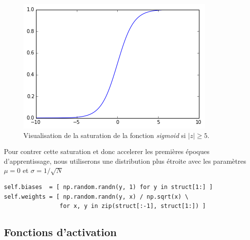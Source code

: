 \documentclass[11pt]{article}
\begin{document}
\begin{figure}[htp]
	\centering
	\includegraphics[scale=.5]{img/sigmoid_sat.png}
	\caption{Visualisation de la saturation de la fonction \emph{sigmoid} si
	$|z| \ge 5$.}
\end{figure}

Pour contrer cette saturation et donc accelerer les premi\`eres \'epoques
d'apprentissage, nous utiliserons une distribution plus \'etroite avec les
param\`etres $\mu=0$ et $\sigma =1/\sqrt{N}$ \\


\begin{lstlisting}
self.biases  = [ np.random.randn(y, 1) for y in struct[1:] ]
self.weights = [ np.random.randn(y, x) / np.sqrt(x) \
				for x, y in zip(struct[:-1], struct[1:]) ]
\end{lstlisting}

\newpage
\subsection{Fonctions d'activation}
\end{document}
